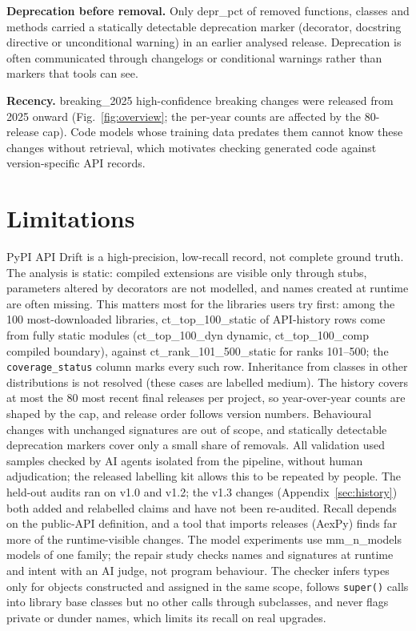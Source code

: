 \documentclass[10pt,twocolumn,letterpaper]{article}
\begin{document}
\textbf{Deprecation before removal.} Only {{depr_pct}} of removed functions, classes and methods carried a
statically detectable deprecation marker (decorator, docstring directive or unconditional warning) in an earlier
analysed release. Deprecation is often communicated through changelogs or conditional warnings rather than
markers that tools can see.

\textbf{Recency.} {{breaking_2025}} high-confidence breaking changes were released from 2025 onward
(Fig.~\ref{fig:overview}; the per-year counts are affected by the 80-release cap). Code models whose training data
predates them cannot know these changes without retrieval, which motivates checking generated code against
version-specific API records.

\section{Limitations}
PyPI API Drift is a high-precision, low-recall record, not complete ground truth. The analysis is static: compiled
extensions are visible only through stubs, parameters altered by decorators are not modelled, and names created at
runtime are often missing. This matters most for the libraries users try first: among the 100 most-downloaded
libraries, {{ct_top_100_static}} of API-history rows come from fully static modules ({{ct_top_100_dyn}} dynamic,
{{ct_top_100_comp}} compiled boundary), against {{ct_rank_101_500_static}} for ranks 101--500; the
\texttt{coverage\_status} column marks every such row. Inheritance from classes in other distributions is not
resolved (these cases are labelled medium). The history covers at most the 80 most recent final releases per
project, so year-over-year counts are shaped by the cap, and release order follows version numbers. Behavioural
changes with unchanged signatures are out of scope, and statically detectable deprecation markers cover only a small
share of removals. All validation used samples checked by AI agents isolated from the pipeline, without human
adjudication; the released labelling kit allows this to be repeated by people. The held-out audits ran on v1.0 and v1.2; the v1.3
changes (Appendix~\ref{sec:history}) both added and relabelled claims and have not been re-audited. Recall depends on
the public-API definition, and a tool that imports releases (AexPy) finds far more of the runtime-visible changes.
The model experiments use {{mm_n_models}} models of one family; the repair study checks names and signatures at
runtime and intent with an AI judge, not program behaviour. The checker infers types only for objects constructed and
assigned in the same scope, follows \texttt{super()} calls into library base classes but no other calls through
subclasses, and never flags private or dunder names, which limits its recall on real upgrades.
\end{document}
